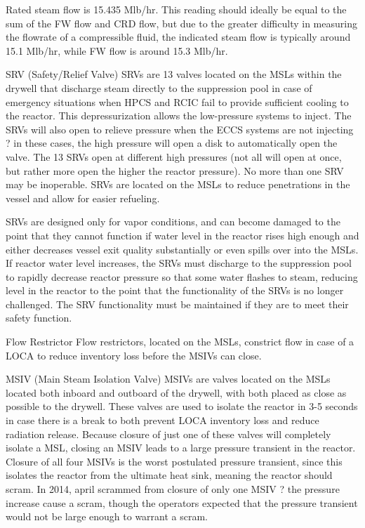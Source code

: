 \documentclass[10pt]{article}
\begin{document}
Rated steam flow is 15.435 Mlb/hr. This reading should ideally be equal to the sum of the FW flow and CRD flow, but due to the greater difficulty in measuring the flowrate of a compressible fluid, the indicated steam flow is typically around 15.1 Mlb/hr, while FW flow is around 15.3 Mlb/hr. 

SRV (Safety/Relief Valve)
SRVs are 13 valves located on the MSLs within the drywell that discharge steam directly to the suppression pool in case of emergency situations when HPCS and RCIC fail to provide sufficient cooling to the reactor. This depressurization allows the low-pressure systems to inject. The SRVs will also open to relieve pressure when the ECCS systems are not injecting ? in these cases, the high pressure will open a disk to automatically open the valve. The 13 SRVs open at different high pressures (not all will open at once, but rather more open the higher the reactor pressure). No more than one SRV may be inoperable. SRVs are located on the MSLs to reduce penetrations in the vessel and allow for easier refueling. 

SRVs are designed only for vapor conditions, and can become damaged to the point that they cannot function if water level in the reactor rises high enough and either decreases vessel exit quality substantially or even spills over into the MSLs. If reactor water level increases, the SRVs must discharge to the suppression pool to rapidly decrease reactor pressure so that some water flashes to steam, reducing level in the reactor to the point that the functionality of the SRVs is no longer challenged. The SRV functionality must be maintained if they are to meet their safety function. 

Flow Restrictor
Flow restrictors, located on the MSLs, constrict flow in case of a LOCA to reduce inventory loss before the MSIVs can close. 

MSIV (Main Steam Isolation Valve)
MSIVs are valves located on the MSLs located both inboard and outboard of the drywell, with both placed as close as possible to the drywell. These valves are used to isolate the reactor in 3-5 seconds in case there is a break to both prevent LOCA inventory loss and reduce radiation release. Because closure of just one of these valves will completely isolate a MSL, closing an MSIV leads to a large pressure transient in the reactor. Closure of all four MSIVs is the worst postulated pressure transient, since this isolates the reactor from the ultimate heat sink, meaning the reactor should scram. In 2014, april scrammed from closure of only one MSIV ? the pressure increase cause a scram, though the operators expected that the pressure transient would not be large enough to warrant a scram.
\end{document}
